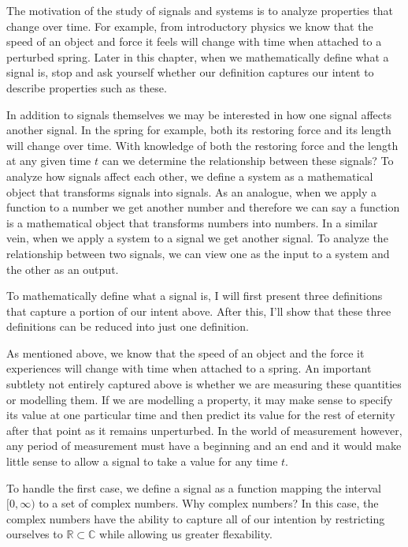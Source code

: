 \documentclass{article}
\begin{document}
The motivation of the study of signals and systems is to analyze properties that change over time. 
For example, from introductory physics we know that the speed of an object and force it feels will change with time when attached to a perturbed spring.
Later in this chapter, when we mathematically define what a signal is, stop and ask yourself whether our definition captures our intent to describe properties such as these.

In addition to signals themselves we may be interested in how one signal affects another signal. 
In the spring for example, both its restoring force and its length will change over time.
With knowledge of both the restoring force and the length at any given time $t$ can we determine the relationship between these signals?
To analyze how signals affect each other, we define a system as a mathematical object that transforms signals into signals. 
As an analogue, when we apply a function to a number we get another number and therefore we can say a function is a mathematical object that transforms numbers into numbers.
In a similar vein, when we apply a system to a signal we get another signal. 
To analyze the relationship between two signals, we can view one as the input to a system and the other as an output.

To mathematically define what a signal is, I will first present three definitions that capture a portion of our intent above. 
After this, I'll show that these three definitions can be reduced into just one definition. 

As mentioned above, we know that the speed of an object and the force it experiences will change with time when attached to a spring. 
An important subtlety not entirely captured above is whether we are measuring these quantities or modelling them.
If we are modelling a property, it may make sense to specify its value at one particular time and then predict its value for the rest of eternity after that point as it remains unperturbed.
In the world of measurement however, any period of measurement must have a beginning and an end and it would make little sense to allow a signal to take a value for any time $t$.

To handle the first case, we define a signal as a function mapping the interval $[0,\infty)$ to a set of complex numbers. 
Why complex numbers?
In this case, the complex numbers have the ability to capture all of our intention by restricting ourselves to $\mathbb{R} \subset \mathbb{C}$ while allowing us greater flexability.  
\end{document}
